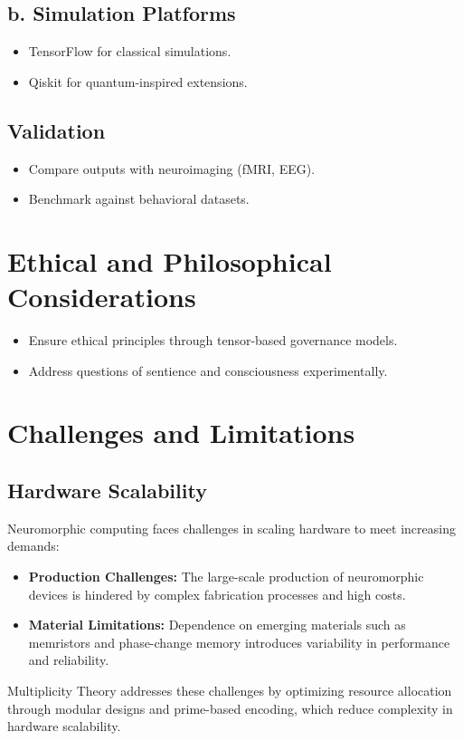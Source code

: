 \documentclass{article}
\theoremstyle{plain}
\begin{document}
\subsection*{b. Simulation Platforms}
\begin{itemize}
    \item TensorFlow for classical simulations.
    \item Qiskit for quantum-inspired extensions.
\end{itemize}

\subsection{Validation}
\begin{itemize}
    \item Compare outputs with neuroimaging (fMRI, EEG).
    \item Benchmark against behavioral datasets.
\end{itemize}

\section{Ethical and Philosophical Considerations}
\begin{itemize}
    \item Ensure ethical principles through tensor-based governance models.
    \item Address questions of sentience and consciousness experimentally.
\end{itemize}

\section{Challenges and Limitations}

\subsection{Hardware Scalability}
Neuromorphic computing faces challenges in scaling hardware to meet increasing demands:
\begin{itemize}
    \item \textbf{Production Challenges:} The large-scale production of neuromorphic devices is hindered by complex fabrication processes and high costs.
    \item \textbf{Material Limitations:} Dependence on emerging materials such as memristors and phase-change memory introduces variability in performance and reliability.
\end{itemize}
Multiplicity Theory addresses these challenges by optimizing resource allocation through modular designs and prime-based encoding, which reduce complexity in hardware scalability.
\end{document}
